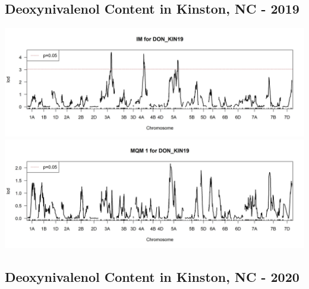 \documentclass[
]{article}
\begin{document}
\subsection{Deoxynivalenol Content in Kinston, NC -
2019}\label{deoxynivalenol-content-in-kinston-nc---2019}

\includegraphics{Scan_IM_DON_KIN19.jpg}
\includegraphics{Scan_MQM1_DON_KIN19.jpg} \pagebreak

\subsection{Deoxynivalenol Content in Kinston, NC -
2020}\label{deoxynivalenol-content-in-kinston-nc---2020}
\end{document}
